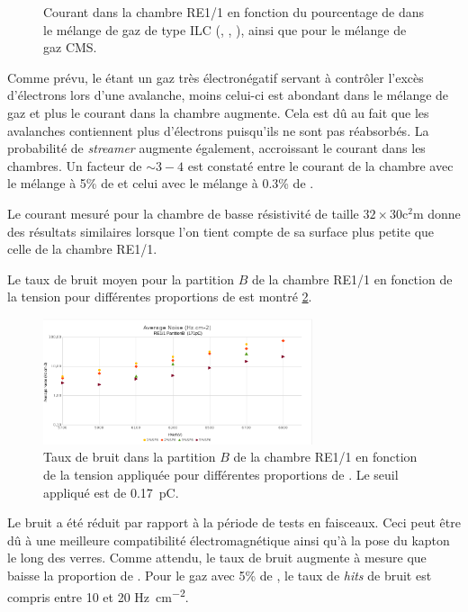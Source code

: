 \begin{figure}[ht!]
	\centering
	\captionsetup{type=figure}\caption{Courant dans la chambre RE1/1 en fonction du pourcentage de  dans le mélange de gaz de type ILC (, , ), ainsi que pour le mélange de gaz CMS.}
	\label{CurrentDOME}
\end{figure}

Comme prévu, le  étant un gaz très électronégatif servant à contrôler l'excès d'électrons lors d'une avalanche, moins celui-ci est abondant dans le mélange de gaz et plus le courant dans la chambre augmente. Cela est dû au fait que les avalanches contiennent plus d'électrons puisqu'ils ne sont pas réabsorbés. La probabilité de \textit{streamer} augmente également, accroissant le courant dans les chambres. Un facteur de $\sim 3-4$ est constaté entre le courant de la chambre avec le mélange à 5\% de  et celui avec le mélange à \num{0.3}\% de .

Le courant mesuré pour la chambre de basse résistivité de taille $\num{32}\times\num{30} \si{\square\centi\meter}$ donne des résultats similaires lorsque l'on tient compte de sa surface plus petite que celle de la chambre RE1/1.

\newpage
Le taux de bruit moyen pour la partition $B$ de la chambre RE1/1 en fonction de la tension pour différentes proportions de  est montré \ref{bruitB}.

 
 \begin{figure}[ht!]
 	\centering
 	\includegraphics[width=0.705\textwidth]{GLA/NoisvsSF6.png}
 	\captionsetup{type=figure}\caption{Taux de bruit dans la partition $B$ de la chambre RE1/1 en fonction de la tension appliquée pour différentes proportions de . Le seuil appliqué est de \SI{0.17}{\pico\coulomb}.}
 	\label{bruitB}
 \end{figure}
 
 Le bruit a été réduit par rapport à la période de tests en faisceaux. Ceci peut être dû à une meilleure compatibilité électromagnétique ainsi qu'à la pose du kapton le long des verres. Comme attendu, le taux de bruit augmente à mesure que baisse la proportion de . Pour le gaz avec 5\% de , le taux de \textit{hits} de bruit est compris entre \num{10} et \num{20} \si{\hertz\per\square\centi\meter}.
 
